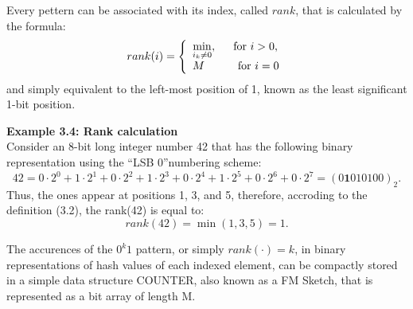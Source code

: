 \documentclass[a4paper,13pt]{article}
\theoremstyle{mytheor}
\begin{document}
Every pettern can be associated with its index, called $rank$, that is
calculated by the formula:
\[
    rank(i)=\left\{
                \begin{array}{ll}
                    \min\limits_{i_k\neq 0}, \indent\text{for } i > 0,\\
                    M\indent\indent\text{for } i = 0
                \end{array}
            \right.
\]
and simply equivalent to the left-most position of 1, known as the least
significant 1-bit position.
\begin{mdframed}
    \textbf{Example 3.4: Rank calculation}\\
    Consider an 8-bit long integer number 42 that has the following binary
    representation using the \textquotedblleft LSB 0\textquotedblright numbering scheme:
    \[
        42 = 0\cdot2^0+1\cdot2^1+0\cdot2^2+1\cdot2^3+0\cdot2^4+1\cdot2^5+0\cdot2^6+0\cdot2^7 = (0\textbf{1}010100)_2 .
    \]
    Thus, the ones appear at positions 1, 3, and 5, therefore, accroding to
    the definition (3.2), the rank(42) is equal to:
    \[rank(42) = \min(1,3,5) = 1.\]
\end{mdframed}
The accurences of the $0^k 1$ pattern, or simply $rank(\cdot) = k$, in binary
representations of hash values of each indexed element, can be compactly
stored in a simple data structure COUNTER, also known as a FM Sketch,
that is represented as a bit array of length M.
\end{document}
